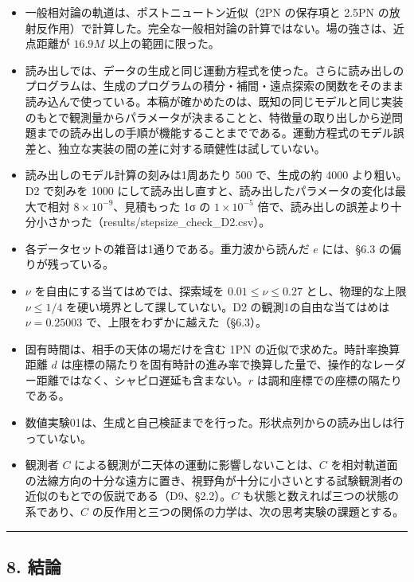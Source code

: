 \documentclass[
  a4paper,
]{ltjsarticle}
\providecommand{\tightlist}{%
  \setlength{\itemsep}{0pt}\setlength{\parskip}{0pt}}
\begin{document}
\begin{itemize}
\tightlist
\item
  一般相対論の軌道は、ポストニュートン近似（2PN の保存項と 2.5PN
  の放射反作用）で計算した。完全な一般相対論の計算ではない。場の強さは、近点距離が
  \(16.9M\) 以上の範囲に限った。
\item
  読み出しでは、データの生成と同じ運動方程式を使った。さらに読み出しのプログラムは、生成のプログラムの積分・補間・遠点探索の関数をそのまま読み込んで使っている。本稿が確かめたのは、既知の同じモデルと同じ実装のもとで観測量からパラメータが決まることと、特徴量の取り出しから逆問題までの読み出しの手順が機能することまでである。運動方程式のモデル誤差と、独立な実装の間の差に対する頑健性は試していない。
\item
  読み出しのモデル計算の刻みは1周あたり 500 で、生成の約 4000
  より粗い。D2 で刻みを 1000
  にして読み出し直すと、読み出したパラメータの変化は最大で相対
  \(8\times10^{-9}\)、見積もった 1σ の \(1\times10^{-5}\)
  倍で、読み出しの誤差より十分小さかった（results/stepsize\_check\_D2.csv）。
\item
  各データセットの雑音は1通りである。重力波から読んだ \(e\) には、§6.3
  の偏りが残っている。
\item
  \(\nu\) を自由にする当てはめでは、探索域を \(0.01\le\nu\le0.27\)
  とし、物理的な上限 \(\nu\le1/4\) を硬い境界として課していない。D2
  の観測1の自由な当てはめは \(\nu=0.25003\)
  で、上限をわずかに越えた（§6.3）。
\item
  固有時間は、相手の天体の場だけを含む 1PN
  の近似で求めた。時計率換算距離 \(d\)
  は座標の隔たりを固有時計の進み率で換算した量で、操作的なレーダー距離ではなく、シャピロ遅延も含まない。\(r\)
  は調和座標での座標の隔たりである。
\item
  数値実験01は、生成と自己検証までを行った。形状点列からの読み出しは行っていない。
\item
  観測者 \(C\) による観測が二天体の運動に影響しないことは、\(C\)
  を相対軌道面の法線方向の十分な遠方に置き、視野角が十分に小さいとする試験観測者の近似のもとでの仮説である（D9、§2.2）。\(C\)
  も状態と数えれば三つの状態の系であり、\(C\)
  の反作用と三つの関係の力学は、次の思考実験の課題とする。
\end{itemize}

\begin{center}\rule{0.5\linewidth}{0.5pt}\end{center}

\subsection{8. 結論}\label{ux7d50ux8ad6}
\end{document}
